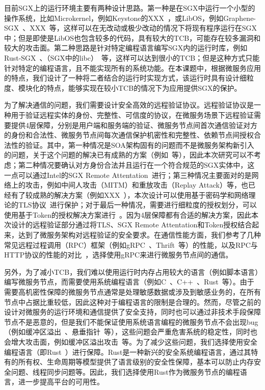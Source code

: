 目前SGX上的运行环境主要有两种设计思路。第一种是在SGX中运行一个小型的操作系统，比如Microkernel，例如Keystone的XXX~\cite{}，或LibOS，例如Graphene-SGX~\cite{}、XXX~\cite{}等，这样可以在无改动或极少改动的情况下将现有程序运行在SGX中；但是即使是LibOS也包含较多的代码，具有较大的TCB，可能存在较多漏洞和较大的攻击面。第二种思路是针对特定编程语言编写SGX内的运行时库，例如Rust-SGX~\cite{}、（SGX中的libc）~\cite{}等，这样可以达到很小的TCB；但是这种方式只能针对特定的编程语言，且不能实现所有的系统功能。在本课题中，根据微服务应用的特点，我们设计了一种将二者结合的运行时实现方式，该运行时具有设计细粒度、模块化的特点，能够实现在较小TCB的情况下为应用提供SGX的保护。

为了解决通信的问题，我们需要设计安全高效的远程验证协议。远程验证协议是一种用于验证远程实体的身份、完整性、可信度的协议，在微服务场景下远程验证需要提供4层保障，分别是用户端和服务端的验证、微服务节点间首次通信验证对方的身份和合法性、微服务节点间每次通信保护机密性和完整性、依赖节点间授权合法性的验证。其中，第一种情况是SOA架构固有的问题而不是微服务架构新引入的问题，关于这个问题的解决已有成熟的方案（例如~\cite{}等），因此本次研究可以不考虑；第二种情况要确认对方身份合法并且运行在一个符合规范的SGX实体中，这一点可以通过Intel的SGX Remote Attentation~\cite{}进行；第三种情况主要面对的是网络上的攻击，例如中间人攻击（MITM）和重放攻击（Replay Attack）等，也已经有了较成熟的解决方案（例如XXX~\cite{}），本次设计可以使用基于密码学和网络理论的TLS协议~\cite{}进行保护；对于最后一种情况，需要进行细粒度的授权划分，可以使用基于Token的授权解决方案进行~\cite{}。因为4层保障都有合适的解决方案，因此本次设计的远程验证部分通过将TLS、SGX Remote Attentation和Token授权结合起来，达到了微服务架构对远程验证的安全要求。在通信性能方面，我们参考了几种常见远程过程调用（RPC）框架（例如gRPC~\cite{}、Thrift~\cite{}等）的性能，以及RPC与HTTP协议的性能的对比~\cite{}，选择使用gRPC来进行微服务节点间的通信。

另外，为了减小TCB，我们难以使用运行时内存占用较大的语言（例如脚本语言）编写微服务节点，而需要使用系统编程语言（例如C~\cite{}、C++~\cite{}、Rust~\cite{}等）。由于需要高机密性保障的微服务节点通常是处理敏感数据或涉及到敏感业务的，在所有节点中占据比重较低，因此这种对于编程语言的限制是合理的。然而，尽管之前的设计对微服务的运行环境和通信提供了安全支持，同时也可以通过非技术手段保障节点不是恶意的，但是我们不能保证使用系统语言编程的微服务节点不会出现bug（例如缓冲区溢出~\cite{}、悬垂指针~\cite{}等），这些问题会严重危害系统的稳定性，同时也会增大攻击面，例如缓冲区溢出攻击~\cite{}等。为了减少这些问题，我们选择使用安全编程语言（即Rust~\cite{}）进行保障。Rust是一种新兴的安全系统编程语言，通过其特有的所有权、生命周期等模型提供了语言级别的安全性保障，基本可以防止内存安全问题、线程同步问题等。因此，我们选择使用Rust作为微服务节点的编程语言，进一步提高平台的可用性。

